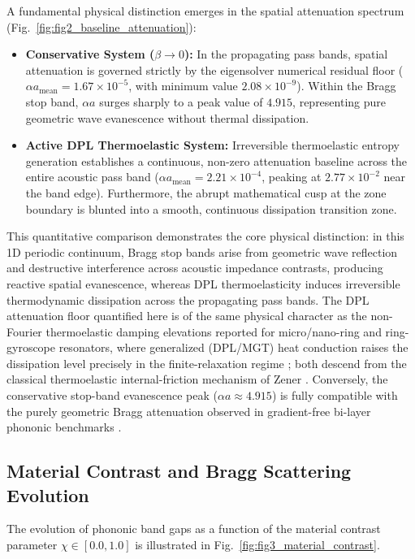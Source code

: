 \documentclass[11pt,a4paper]{article}
\begin{document}
A fundamental physical distinction emerges in the spatial attenuation spectrum (Fig.~\ref{fig:fig2_baseline_attenuation}):
\begin{itemize}
    \item \textbf{Conservative System ($\beta \to 0$):} In the propagating pass bands, spatial attenuation is governed strictly by the eigensolver numerical residual floor ($\alpha a_{\text{mean}} = 1.67 \times 10^{-5}$, with minimum value $2.08 \times 10^{-9}$). Within the Bragg stop band, $\alpha a$ surges sharply to a peak value of $4.915$, representing pure geometric wave evanescence without thermal dissipation.
    \item \textbf{Active DPL Thermoelastic System:} Irreversible thermoelastic entropy generation establishes a continuous, non-zero attenuation baseline across the entire acoustic pass band ($\alpha a_{\text{mean}} = 2.21 \times 10^{-4}$, peaking at $2.77 \times 10^{-2}$ near the band edge). Furthermore, the abrupt mathematical cusp at the zone boundary is blunted into a smooth, continuous dissipation transition zone.
\end{itemize}
This quantitative comparison demonstrates the core physical distinction: in this 1D periodic continuum, Bragg stop bands arise from geometric wave reflection and destructive interference across acoustic impedance contrasts, producing reactive spatial evanescence, whereas DPL thermoelasticity induces irreversible thermodynamic dissipation across the propagating pass bands. The DPL attenuation floor quantified here is of the same physical character as the non-Fourier thermoelastic damping elevations reported for micro/nano-ring and ring-gyroscope resonators, where generalized (DPL/MGT) heat conduction raises the dissipation level precisely in the finite-relaxation regime \cite{zhou2024generalized,ge2024theoretical,singh2024thermoelastic}; both descend from the classical thermoelastic internal-friction mechanism of Zener \cite{zener1937internal}. Conversely, the conservative stop-band evanescence peak ($\alpha a \approx 4.915$) is fully compatible with the purely geometric Bragg attenuation observed in gradient-free bi-layer phononic benchmarks \cite{li2016band}.

\subsection{Material Contrast and Bragg Scattering Evolution}
\label{sec:res_s2}

The evolution of phononic band gaps as a function of the material contrast parameter $\chi \in [0.0, 1.0]$ is illustrated in Fig.~\ref{fig:fig3_material_contrast}.
\end{document}
